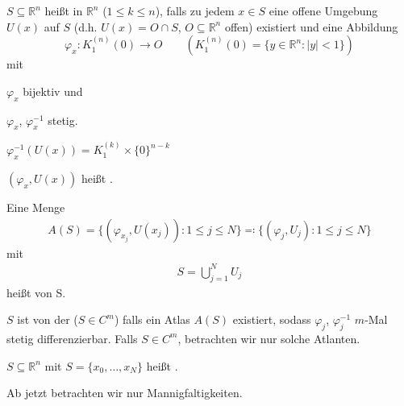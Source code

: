 \begin{theorem}[Definition] \label{thm:9.1}
  \begin{enum-arab}
    \item $S \subseteq \mathbb{R}^n$ heißt  in $\mathbb{R}^n$ ($1 \leq k \leq n$), falls zu jedem $x \in S$ eine offene Umgebung $U(x)$ auf $S$ (d.h. $U(x) = O \cap S$, $O \subseteq \mathbb{R}^n$ offen) existiert und eine Abbildung \[ \varphi_x : K_1^{(n)}(0) \to O \qquad \left( K_1^{(n)}(0) = \{ y \in \mathbb{R}^n : |y| < 1 \} \right) \] mit
    \begin{enum-alph}
      \item $\varphi_x$ bijektiv und
      \item $\varphi_x$, $\varphi_x^{-1}$ stetig.
      \item $ \varphi_x^{-1}(U(x))=K_1^{(k)}\times \{0\}^{n-k}  $
    \end{enum-alph}
    $(\varphi_x,U(x))$ heißt .
    
    \item Eine Menge
    \begin{align*}
      A(S) = \{ (\varphi_{x_j},U(x_j)) : 1 \leq j \leq N \} \eqcolon \{ (\varphi_j,U_j) : 1 \leq j \leq N \}
    \end{align*}
    mit
    \begin{align*}
      S = \bigcup\limits_{j=1}^{N} U_j
    \end{align*}
    heißt  von S.
    
    \item $S$ ist von der  ($S \in C^m$) falls ein Atlas $A(S)$ existiert, sodass $\varphi_j$, $\varphi_j^{-1}$ $m$-Mal stetig differenzierbar. Falls $S \in C^m$, betrachten wir nur solche Atlanten.
    
    \item $S \subseteq \mathbb{R}^n$ mit $S = \{ x_0,\ldots,x_N \}$ heißt  .
  \end{enum-arab}
\end{theorem}

\begin{theorem}[Vereinbarung] \label{thm:9.2}
  Ab jetzt betrachten wir nur Mannigfaltigkeiten.
\end{theorem}

